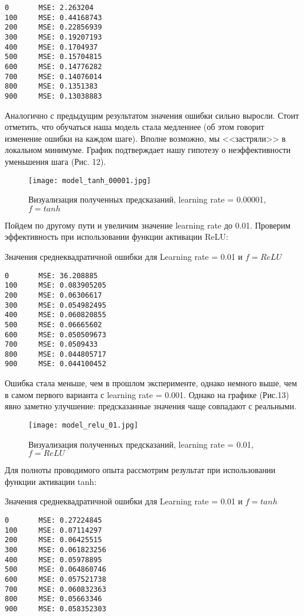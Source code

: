 \documentclass[12pt, a4paper]{article}
\begin{document}
\begin{verbatim}
0   	MSE: 2.263204
100 	MSE: 0.44168743
200 	MSE: 0.22856939
300 	MSE: 0.19207193
400 	MSE: 0.1704937
500 	MSE: 0.15704815
600 	MSE: 0.14776282
700 	MSE: 0.14076014
800 	MSE: 0.1351383
900 	MSE: 0.13038883
\end{verbatim}
Аналогично с предыдущим результатом значения ошибки сильно выросли. Стоит отметить, что обучаться наша модель стала медленнее (об этом говорит изменение ошибки на каждом шаге). Вполне возможно, мы <<застряли>> в локальном минимуме. График подтверждает нашу гипотезу о неэффективности уменьшения шага (Рис. 12).

\begin{figure}[ht]
	\noindent\centering
	\texttt{[image: model\_tanh\_00001.jpg]}
	\caption{Визуализация полученных предсказаний, learning rate = 0.00001, $f = tanh$}
\end{figure}

Пойдем по другому пути и увеличим значение learning rate до 0.01.
Проверим эффективность при использовании функции активации ReLU:

Значения среднеквадратичной ошибки для Learning rate = 0.01 и $f = ReLU$

\begin{verbatim}
0   	MSE: 36.208885
100 	MSE: 0.083905205
200 	MSE: 0.06306617
300 	MSE: 0.054982495
400 	MSE: 0.060820855
500 	MSE: 0.06665602
600 	MSE: 0.050509673
700 	MSE: 0.0509433
800 	MSE: 0.044805717
900 	MSE: 0.044100452
\end{verbatim}

Ошибка стала меньше, чем в прошлом эксперименте, однако немного выше, чем в самом первого варианта с learning rate = 0.001. Однако на графике (Рис.13) явно заметно улучшение: предсказанные значения чаще совпадают с реальными.

\begin{figure}[ht]
	\noindent\centering
	\texttt{[image: model\_relu\_01.jpg]}
	\caption{Визуализация полученных предсказаний, learning rate = 0.01, $f = ReLU$}
\end{figure}

Для полноты проводимого опыта рассмотрим результат при использовании функции активации tanh:

Значения среднеквадратичной ошибки для Learning rate = 0.01 и $f = tanh$

\begin{verbatim}
0   	MSE: 0.27224845
100 	MSE: 0.07114297
200 	MSE: 0.06425515
300 	MSE: 0.061823256
400 	MSE: 0.05978895
500 	MSE: 0.064860746
600 	MSE: 0.057521738
700 	MSE: 0.060832363
800 	MSE: 0.05663346
900 	MSE: 0.058352303
\end{verbatim}
\end{document}
